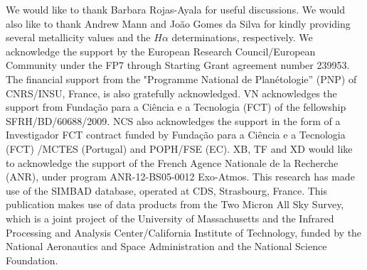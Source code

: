 \documentclass[referee]{aa}
\begin{document}
\begin{acknowledgements}
We would like to thank Barbara Rojas-Ayala for useful discussions. We would also like to thank Andrew Mann and Jo\~ao Gomes da Silva for kindly providing several metallicity values and the $H\alpha$ determinations, respectively. We acknowledge the support by the European Research Council/European Community under the FP7 through Starting Grant agreement number 239953. The financial support from the "Programme National de Plan\'etologie'' (PNP) of CNRS/INSU, France, is also gratefully acknowledged. VN acknowledges the support from Funda\c{c}\~ao para a Ci\^encia e a Tecnologia (FCT) of the fellowship SFRH/BD/60688/2009. NCS also acknowledges the support in the form of a Investigador FCT contract funded by Funda\c{c}\~ao para a Ci\^encia e a Tecnologia (FCT) /MCTES (Portugal) and POPH/FSE (EC). XB, TF and XD would like to acknowledge the support of the French Agence Nationale de la Recherche (ANR), under program ANR-12-BS05-0012 Exo-Atmos. This research has made use of the SIMBAD database, operated at CDS, Strasbourg, France. This publication makes use of data products from the Two Micron All Sky Survey, which is a joint project of the University of Massachusetts and the Infrared Processing and Analysis Center/California Institute of Technology, funded by the National Aeronautics and Space Administration and the National Science Foundation.

\end{acknowledgements}
\end{document}
